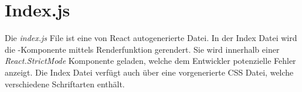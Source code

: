 \section{Index.js}
\label{index}

Die \textit{index.js} File ist eine von React autogenerierte Datei. In der Index Datei wird die 
-Komponente mittels Renderfunktion gerendert. Sie wird innerhalb einer 
\textit{React.StrictMode} Komponente geladen, welche dem Entwickler potenzielle Fehler anzeigt.
Die Index Datei verfügt auch über eine vorgenerierte CSS Datei, welche verschiedene Schriftarten 
enthält. 